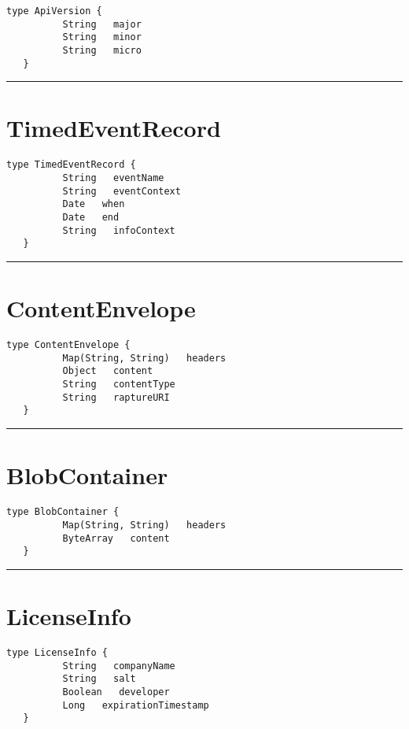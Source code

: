 \begin{lstlisting}[style=nonumbers]
   type ApiVersion {
          String   major
          String   minor
          String   micro
   }
\end{lstlisting}

\rule{12cm}{2pt}
\section{TimedEventRecord}
\label{type:TimedEventRecord}

\begin{lstlisting}[style=nonumbers]
   type TimedEventRecord {
          String   eventName
          String   eventContext
          Date   when
          Date   end
          String   infoContext
   }
\end{lstlisting}

\rule{12cm}{2pt}
\section{ContentEnvelope}
\label{type:ContentEnvelope}

\begin{lstlisting}[style=nonumbers]
   type ContentEnvelope {
          Map(String, String)   headers
          Object   content
          String   contentType
          String   raptureURI
   }
\end{lstlisting}

\rule{12cm}{2pt}
\section{BlobContainer}
\label{type:BlobContainer}

\begin{lstlisting}[style=nonumbers]
   type BlobContainer {
          Map(String, String)   headers
          ByteArray   content
   }
\end{lstlisting}

\rule{12cm}{2pt}
\section{LicenseInfo}
\label{type:LicenseInfo}

\begin{lstlisting}[style=nonumbers]
   type LicenseInfo {
          String   companyName
          String   salt
          Boolean   developer
          Long   expirationTimestamp
   }
\end{lstlisting}

